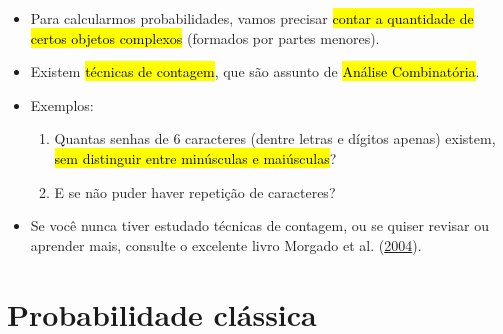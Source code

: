 \documentclass[
  11pt]{report}
\begin{document}
\begin{itemize}
\item
  Para calcularmos probabilidades, vamos precisar {\hl{contar a quantidade de certos objetos complexos}} (formados por partes menores).
\item
  Existem {\hl{técnicas de contagem}}, que são assunto de {\hl{Análise Combinatória}}.
\item
  Exemplos:

  \begin{enumerate}
  \def\labelenumi{\arabic{enumi}.}
  \item
    Quantas senhas de $6$ caracteres (dentre letras e dígitos apenas) existem, {\hl{sem distinguir entre minúsculas e maiúsculas}}?

  \item
    E se não puder haver repetição de caracteres?

  \end{enumerate}
\item
  Se você nunca tiver estudado técnicas de contagem, ou se quiser revisar ou aprender mais, consulte o excelente livro Morgado et al. (\protect\hyperlink{ref-morgadoAnaliseCombinatoriaProbabilidade2004}{2004}).
\end{itemize}

\hypertarget{probabilidade-cluxe1ssica}{%
\section{Probabilidade clássica}\label{probabilidade-cluxe1ssica}}
\end{document}
